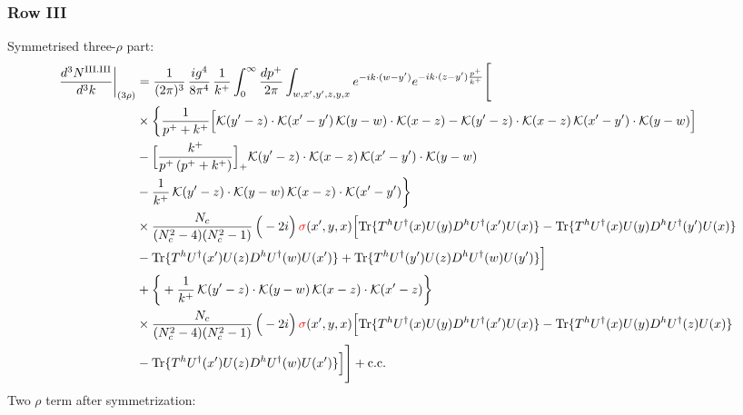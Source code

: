 \documentclass[9pt]{article}
\numberwithin{equation}{section}
\begin{document}
\subsubsection*{Row III}
Symmetrised three-$\rho$ part:
\begin{align}
\frac{d^{3}N^{\rm III.III}}{d^{3}k}\bigg|_{(3\rho)}&=\frac{1}{(2\pi)^{3}}\,\frac{ig^{4}}{8\pi^{4}}\,\frac{1}{k^{+}}\int_{0}^{\infty}\frac{dp^{+}}{2\pi}\int_{w,x',y',z,y,x}e^{-ik\cdot(w-y')}e^{-ik\cdot(z-y')\frac{p^{+}}{k^{+}}}\Bigg[\notag\\
&\times\bigg\{\frac{1}{p^{+}+k^{+}}\Big[\mathcal{K}(y'-z)\cdot\mathcal{K}(x'-y')\,\mathcal{K}(y-w)\cdot\mathcal{K}(x-z)-\mathcal{K}(y'-z)\cdot\mathcal{K}(x-z)\,\mathcal{K}(x'-y')\cdot\mathcal{K}(y-w)\Big]\notag\\
&-\Big[\frac{k^{+}}{p^{+}\,(p^{+}+k^{+})}\Big]_{+}\mathcal{K}(y'-z)\cdot\mathcal{K}(x-z)\,\mathcal{K}(x'-y')\cdot\mathcal{K}(y-w)\notag\\
&-\frac{1}{k^{+}}\,\mathcal{K}(y'-z)\cdot\mathcal{K}(y-w)\,\mathcal{K}(x-z)\cdot\mathcal{K}(x'-y')\bigg\}\notag\\
&\times \frac{N_{c}}{(N_{c}^{2}-4)(N_{c}^{2}-1)}\,\Big(-2i\Big)\,{\color{red}\sigma}(x',y,x)\Big[{\rm Tr}\{T^{h}U^{\dagger}(x)U(y)D^{h}U^{\dagger}(x')U(x)\}-{\rm Tr}\{T^{h}U^{\dagger}(x)U(y)D^{h}U^{\dagger}(y')U(x)\}\notag\\
& -{\rm Tr}\{T^{h}U^{\dagger}(x')U(z)D^{h}U^{\dagger}(w)U(x')\}+{\rm Tr}\{T^{h}U^{\dagger}(y')U(z)D^{h}U^{\dagger}(w)U(y')\}\Big]\notag\\
&+\bigg\{+\frac{1}{k^{+}}\,\mathcal{K}(y'-z)\cdot\mathcal{K}(y-w)\,\mathcal{K}(x-z)\cdot\mathcal{K}(x'-z)\bigg\}\notag\\
&\times \frac{N_{c}}{(N_{c}^{2}-4)(N_{c}^{2}-1)}\,\Big(-2i\Big)\,{\color{red}\sigma}(x',y,x)\Big[{\rm Tr}\{T^{h}U^{\dagger}(x)U(y)D^{h}U^{\dagger}(x')U(x)\}-{\rm Tr}\{T^{h}U^{\dagger}(x)U(y)D^{h}U^{\dagger}(z)U(x)\}\notag\\
& -{\rm Tr}\{T^{h}U^{\dagger}(x')U(z)D^{h}U^{\dagger}(w)U(x')\}\Big]\Bigg]+{\rm c.c.}\label{eq:E-III.III-3}
\end{align}
Two $\rho$ term after symmetrization:
\end{document}
